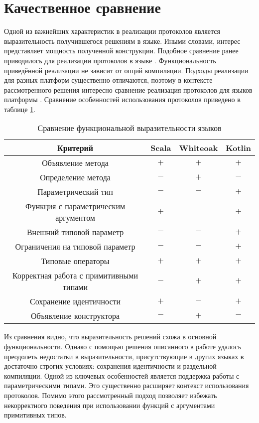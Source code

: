 \section{Качественное сравнение}
Одной из важнейших характеристик в реализации протоколов является выразительность получившегося решениям в языке. Иными словами, интерес представляет мощность полученной конструкции. Подобное сравнение ранее приводилось для реализации протоколов в языке \cite{whiteoak}. Функциональность приведённой реализации не зависит от опций компиляции. Подходы реализации для разных платформ существенно отличаются, поэтому в контексте рассмотренного решения интересно сравнение реализация протоколов для языков платформы . Сравнение особенностей использования протоколов приведено в таблице \ref{features_comparison}.

\begin{table}[htb]
  \begin{center}
    \begin{tabular}{|c|c|c|c|} \hline
      Критерий & Scala & Whiteoak & Kotlin \\ \hline
      Объявление метода & $+$ & $+$ & $+$ \\ \hline
      Определение метода & $-$ & $+$ & $-$ \\ \hline
      Параметрический тип & $-$ & $-$ & $+$ \\ \hline
      Функция с параметрическим аргументом & $+$ & $-$ & $+$ \\ \hline
      Внешний типовой параметр & $-$ & $-$ & $+$ \\ \hline
      Ограничения на типовой параметр & $-$ & $-$ & $+$ \\ \hline
      Типовые операторы & $+$ & $+$ & $+$ \\ \hline
      Корректная работа с примитивными типами & $-$ & $+$ & $+$ \\ \hline
      Сохранение идентичности & $+$ & $-$ & $+$ \\ \hline
      Объявление конструктора & $-$ & $+$ & $-$ \\ \hline
    \end{tabular}
    \caption{Сравнение функциональной выразительности языков}
    \label{features_comparison}
  \end{center}
\end{table}

Из сравнения видно, что выразительность решений схожа в основной функциональности. Однако с помощью решения описанного в работе удалось преодолеть недостатки в выразительности, присутствующие в других языках в достаточно строгих условиях: сохранения идентичности и раздельной компиляции. Одной из ключевых особенностей является поддержка работы с параметрическими типами. Это существенно расширяет контекст использования протоколов. Помимо этого рассмотренный подход позволяет избежать некорректного поведения при использовании функций с аргументами примитивных типов.
